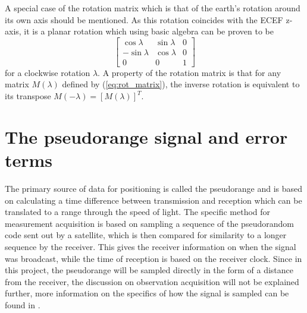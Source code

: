 A special case of the rotation matrix which is that of the earth's rotation around its own axis should be mentioned. As this rotation coincides with the ECEF z-axis, it is a planar rotation which using basic algebra can be proven to be
\begin{equation}
\begin{bmatrix}\label{eq:rot_matrix}
\cos \lambda &\sin \lambda & 0 \\ 
-\sin \lambda & \cos \lambda & 0\\
0 & 0 & 1
\end{bmatrix}
\end{equation}
for a clockwise rotation $\lambda$. A property of the rotation matrix is that for any matrix $M(\lambda)$ defined by (\ref{eq:rot_matrix}), the inverse rotation is equivalent to its transpose $M(-\lambda)=[M(\lambda)]^T$.


\section{The pseudorange signal and error terms}\label{signalAndError}
The primary source of data for positioning is called the pseudorange and is based on calculating a time difference between transmission and reception which can be translated to a range through the speed of light. The specific method for measurement acquisition is based on sampling a sequence of the pseudorandom code sent out by a satellite, which is then compared for similarity to a longer sequence by the receiver. This gives the receiver information on when the signal was broadcast, while the time of reception is based on the receiver clock. Since in this project, the pseudorange will be sampled directly in the form of a distance from the receiver, the discussion on observation acquisition will not be explained further, more information on the specifics of how the signal is sampled can be found in \cite{Jeffrey}. 
